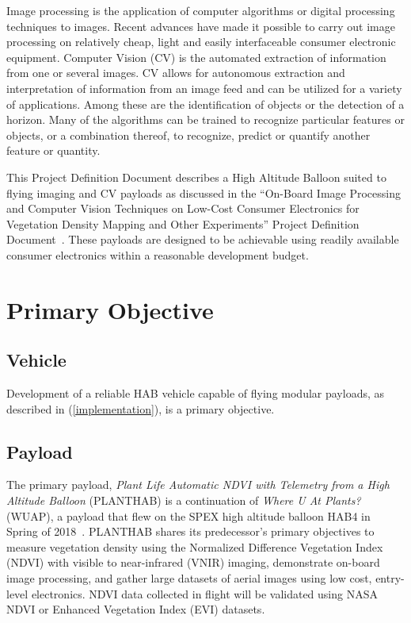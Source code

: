 \documentclass[conference]{IEEEtran} %
\begin{document}
Image processing is the application of computer algorithms or digital processing techniques to images. 
Recent advances have made it possible to carry out image processing on relatively cheap, light and easily interfaceable consumer electronic equipment. 
Computer Vision (CV) is the automated extraction of information from one or several images. 
CV allows for autonomous extraction and interpretation of information from an image feed and can be utilized for a variety of applications. 
Among these are the identification of objects or the detection of a horizon. 
Many of the algorithms can be trained to recognize particular features or objects, or a combination thereof, to recognize, predict or quantify another feature or quantity.

This Project Definition Document describes a High Altitude Balloon suited to flying imaging and CV payloads as discussed in the ``On-Board Image Processing and Computer Vision Techniques on Low-Cost Consumer Electronics for Vegetation Density Mapping and Other Experiments'' Project Definition Document~\cite{habcvpdd}. 
These payloads are designed to be achievable using readily available consumer electronics within a reasonable development budget. 

\section{Primary Objective}
\label{primaryobjectives}
\subsection{Vehicle}
\label{vehicleobjectives}
Development of a reliable HAB vehicle capable of flying modular payloads, as described in (\autoref{implementation}), is a primary objective. 

\subsection{Payload}
\label{payloadobjectives}
The primary payload, \textit{Plant Life Automatic NDVI with Telemetry from a High Altitude Balloon} (PLANTHAB) is a continuation of \textit{Where U At Plants?} (WUAP), a payload that flew on the SPEX high altitude balloon  HAB4 in Spring of 2018~\cite{wuaphab4}. 
PLANTHAB shares its predecessor's primary objectives to measure vegetation density using the Normalized Difference Vegetation Index (NDVI) with visible to near-infrared (VNIR) imaging, demonstrate on-board image processing, and gather large datasets of aerial images using low cost, entry-level electronics. 
NDVI data collected in flight will be validated using NASA NDVI or Enhanced Vegetation Index (EVI) datasets.
\end{document}
